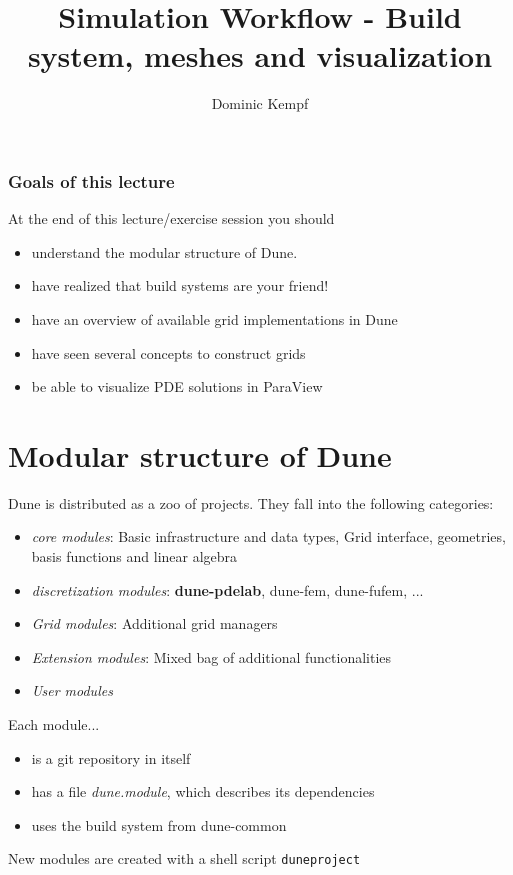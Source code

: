 \documentclass[aspectratio=169,11pt]{beamer}
\title{Simulation Workflow - Build system, meshes and visualization}
\author{Dominic Kempf}
\theoremstyle{definition}
\begin{document}
\begin{frame}
\titlepage
\end{frame}

\begin{frame}
 \frametitle{Goals of this lecture}

 At the end of this lecture/exercise session you should
 \begin{itemize}
  \item understand the modular structure of Dune.
  \item have realized that build systems are your friend!
  \item have an overview of available grid implementations in Dune
  \item have seen several concepts to construct grids
  \item be able to visualize PDE solutions in ParaView
 \end{itemize}
\end{frame}


\section{Modular structure of Dune}

\begin{frame}[fragile]
 Dune is distributed as a zoo of projects.
 They fall into the following categories:

 \begin{itemize}
  \item \textit{core modules}: Basic infrastructure and data types,
  Grid interface, geometries, basis functions and linear algebra
  \item \textit{discretization modules}: \textbf{dune-pdelab},
  dune-fem, dune-fufem, ...
  \item \textit{Grid modules}: Additional grid managers
  \item \textit{Extension modules}: Mixed bag of additional functionalities
  \item \textit{User modules}
 \end{itemize}

 Each module...
 \begin{itemize}
  \item is a git repository in itself
  \item has a file \textit{dune.module}, which describes its dependencies
  \item uses the build system from dune-common
 \end{itemize}

 New modules are created with a shell script \lstinline!duneproject!
\end{frame}
\end{document}
